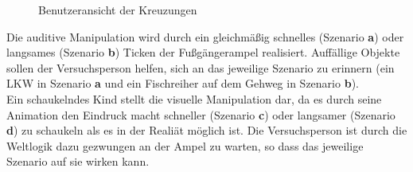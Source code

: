 \documentclass{Bericht}
\begin{document}
\begin{figure}[H]

	\caption{Benutzeransicht der Kreuzungen}
\end{figure}

Die auditive Manipulation wird durch ein gleichmäßig schnelles (Szenario \textbf{a}) oder langsames (Szenario \textbf{b}) Ticken der Fußgängerampel realisiert. Auffällige Objekte sollen der Versuchsperson helfen, sich an das jeweilige Szenario zu erinnern (ein LKW in Szenario \textbf{a} und ein Fischreiher auf dem Gehweg in Szenario \textbf{b}).\\
Ein schaukelndes Kind stellt die visuelle Manipulation dar, da es durch seine Animation den Eindruck macht schneller (Szenario \textbf{c}) oder langsamer (Szenario \textbf{d}) zu schaukeln als es in der Realiät möglich ist. Die Versuchsperson ist durch die Weltlogik dazu gezwungen an der Ampel zu warten, so dass das jeweilige Szenario auf sie wirken kann.
\label{subsec:aufbau}
\end{document}
